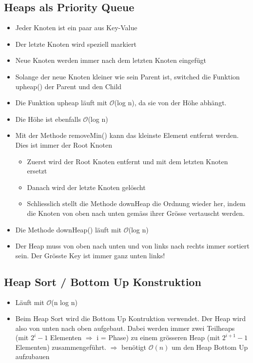 \subsection{Heaps als Priority Queue}
\begin{itemize}
	\item Jeder Knoten ist ein paar aus Key-Value
	\item Der letzte Knoten wird speziell markiert
	\item Neue Knoten werden immer nach dem letzten Knoten eingefügt
	\item Solange der neue Knoten kleiner wie sein Parent ist, switched die Funktion upheap() der Parent und den Child
	\item Die Funktion upheap läuft mit $\mathcal{O}$(log n), da sie von der Höhe abhängt. 
	\item Die Höhe ist ebenfalls $\mathcal{O}$(log n)
	\item Mit der Methode removeMin() kann das kleinste Element entfernt werden. Dies ist immer der Root Knoten
	\begin{itemize}
		\item Zuerst wird der Root Knoten entfernt und mit dem letzten Knoten ersetzt
		\item Danach wird der letzte Knoten gelöscht
		\item Schliesslich stellt die Methode downHeap die Ordnung wieder her, indem die Knoten von oben nach unten gemäss ihrer Grösse vertauscht werden.
	\end{itemize}
	\item Die Methode downHeap() läuft mit $\mathcal{O}$(log n)
	\item Der Heap muss von oben nach unten und von links nach rechts immer sortiert sein. Der Grösste Key ist immer ganz unten links!
\end{itemize}

\subsection{Heap Sort / Bottom Up Konstruktion}
\begin{itemize}
	\item Läuft mit $\mathcal{O}$(n log n)
	\item Beim Heap Sort wird die Bottom Up Kontruktion verwendet. Der Heap wird also von unten nach oben aufgebaut. Dabei werden immer zwei Teilheaps (mit $2^i - 1$ Elementen $\Rightarrow$ i = Phase) zu einem grösseren Heap (mit $2^{i+1} - 1$ Elementen) zusammengeführt.  $\Rightarrow$ benötigt $\mathcal{O}(n)$ um den Heap Bottom Up aufzubauen
\end{itemize}

